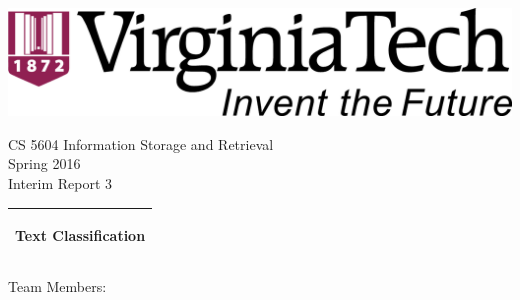 %
%
%
%
%
\begin{titlepage}
  \addtolength{\hoffset}{0.5\evensidemargin-0.5\oddsidemargin} %
  \noindent%
  \begin{center}
    \includegraphics[width=0.5\textwidth-\tabcolsep]{figures/vt-logo} \\
  \end{center}
  \vspace{0.5cm}
  \begin{center}
    {\Large
      CS 5604 Information Storage and Retrieval \\
      Spring 2016\\
    }
    \vspace{0.2cm}
    {\large
      Interim Report 3%
    }
  \end{center}
  \vspace{0.2cm}
  \begin{tabular}{@{}p{\textwidth}@{}}
    \toprule[2pt]
    \midrule
    \vspace{0.2cm}
    \begin{center}
    \Huge{\textbf{
      Text Classification%
    }}
    \end{center}
    \vspace{0.2cm}\\
    \midrule
    \toprule[2pt]
  \end{tabular}
  \vspace{2 cm}
  \begin{center}
    {\Large
      Team Members:\\
}
\end{center}
\end{titlepage}
